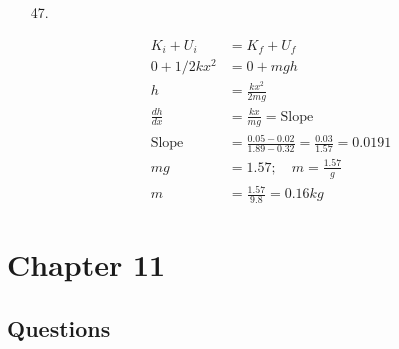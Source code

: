 \begin{itemize}
        \pagebreak

        \item [47.]\mbox{}\\
        
        \begin{center}
        \end{center}

        \begin{align*}
            K_{i} + U_{i}   & = K_{f} + U_{f}                   \\
            0 + 1/2kx^{2}   & = 0 + mgh                         \\
            h               & = \frac{kx^{2}}{2mg}              \\
            \frac{dh}{dx}   & = \frac{kx}{mg} = \text{Slope}    \\
            \text{Slope}    & = \frac{0.05-0.02}{1.89-0.32}
                              = \frac{0.03}{1.57} = 0.0191      \\
            mg              & = 1.57; \quad m = \frac{1.57}{g}  \\
            m               & = \frac{1.57}{9.8} = \boxed{0.16kg}
        \end{align*}

    \end{itemize}

    \pagebreak

    \section*{Chapter 11}

    \subsection*{Questions}

